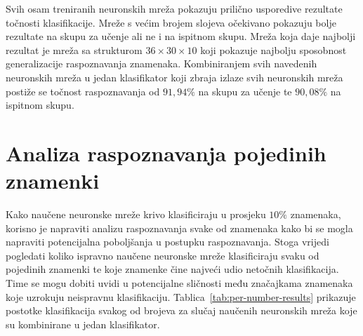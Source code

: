 Svih osam treniranih neuronskih mreža pokazuju prilično usporedive rezultate točnosti klasifikacije. Mreže s većim
brojem slojeva očekivano pokazuju bolje rezultate na skupu za učenje ali ne i na ispitnom skupu. Mreža koja daje
najbolji rezultat je mreža sa strukturom $36 \times 30 \times 10$ koji pokazuje najbolju sposobnost generalizacije
raspoznavanja znamenaka. Kombiniranjem svih navedenih neuronskih mreža u jedan klasifikator koji zbraja izlaze svih
neuronskih mreža postiže se točnost raspoznavanja od $91{,}94\%$ na skupu za učenje te $90{,}08\%$ na ispitnom skupu.


\section{Analiza raspoznavanja pojedinih znamenki}
Kako naučene neuronske mreže krivo klasificiraju u prosjeku $10\%$ znamenaka, korisno je napraviti analizu raspoznavanja
svake od znamenaka kako bi se mogla napraviti potencijalna poboljšanja u postupku raspoznavanja. Stoga vrijedi
pogledati koliko ispravno naučene neuronske mreže klasificiraju svaku od pojedinih znamenki te koje znamenke čine
najveći udio netočnih klasifikacija. Time se mogu dobiti uvidi u potencijalne sličnosti među značajkama znamenaka koje
uzrokuju neispravnu klasifikaciju. Tablica\ \ref{tab:per-number-results} prikazuje postotke klasifikacija svakog od
brojeva za slučaj naučenih neuronskih mreža koje su kombinirane u jedan klasifikator.
